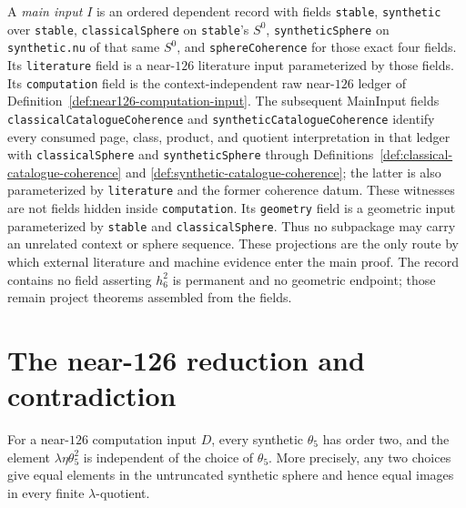 \begin{definition}
  \label{def:kervaire-main-input}
  \notready
  A \emph{main input} $I$ is an ordered dependent record with fields
  \texttt{stable}, \texttt{synthetic} over \texttt{stable},
  \texttt{classicalSphere} on \texttt{stable}'s $S^0$,
  \texttt{syntheticSphere} on
  \texttt{synthetic.nu} of that same $S^0$, and
  \texttt{sphereCoherence} for those exact four fields.  Its
  \texttt{literature} field is a near-$126$ literature input parameterized by
  those fields.  Its \texttt{computation} field is the context-independent raw
  near-$126$ ledger of Definition~\ref{def:near126-computation-input}.  The
  subsequent MainInput fields \texttt{classicalCatalogueCoherence} and
  \texttt{syntheticCatalogueCoherence} identify every consumed page, class,
  product, and quotient interpretation in that ledger with
  \texttt{classicalSphere} and \texttt{syntheticSphere} through
  Definitions~\ref{def:classical-catalogue-coherence} and
  \ref{def:synthetic-catalogue-coherence}; the latter is also parameterized by
  \texttt{literature} and the former coherence datum.  These witnesses are not
  fields hidden inside \texttt{computation}.  Its \texttt{geometry} field is a
  geometric input parameterized by
  \texttt{stable} and \texttt{classicalSphere}.  Thus no subpackage may carry
  an unrelated context or sphere sequence.  These projections are the only
  route by which external literature and machine evidence enter the main
  proof.  The record contains no field asserting $h_6^2$ is permanent and no
  geometric endpoint; those remain project theorems assembled from the fields.
\end{definition}

\section{The near-126 reduction and contradiction}

\begin{proposition}
  \label{prop:theta5-choice-independence}
  \notready
  For a near-$126$ computation input $D$, every synthetic $\theta_5$ has order
  two, and the element
  $\lambda\eta\theta_5^2$ is independent of the choice of $\theta_5$.
  More precisely, any two choices give equal elements in the untruncated
  synthetic sphere and hence equal images in every finite $\lambda$-quotient.
\end{proposition}

